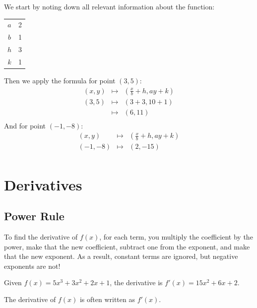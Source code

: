 \documentclass{beamer}
\begin{document}
    \begin{frame}[allowframebreaks]
        We start by noting down all relevant information about the function:
        \begin{table}
            \begin{tabular}{c|c}
                $a$ & 2 \\
                $b$ & 1 \\
                $h$ & 3 \\
                $k$ & 1 \\
            \end{tabular} 
        \end{table}
        Then we apply the formula for point $(3,5)$:
        \begin{eqnarray*}
            (x, y) & \mapsto & \left(\frac{x}{b} + h, ay + k \right) \\
            (3, 5) & \mapsto & \left(3 + 3, 10 + 1\right) \\
            & \mapsto & \left(6, 11\right) \\
        \end{eqnarray*}
        And for point $(-1,-8)$:
        \begin{eqnarray*}
            (x, y) & \mapsto & \left(\frac{x}{b} + h, ay + k \right) \\
            (-1, -8) & \mapsto & \left(2, -15\right) \\
        \end{eqnarray*}
    \end{frame}
    \section{Derivatives}
    \subsection{Power Rule}
    \begin{frame}
        To find the derivative of $f(x)$, for each term, you multiply the coefficient by the power, make that the new coefficient, subtract one from the exponent, and make that the new exponent. \alert{As a result, constant terms are ignored, but negative exponents are not!}
        \begin{example}
            Given $f(x)=5x^3+3x^2+2x+1$, the derivative is $f'(x)=15x^2 + 6x + 2$.
        \end{example}
        \begin{definition}
            The derivative of $f(x)$ is often written as $f'(x)$.
        \end{definition}
    \end{frame}
\end{document}
